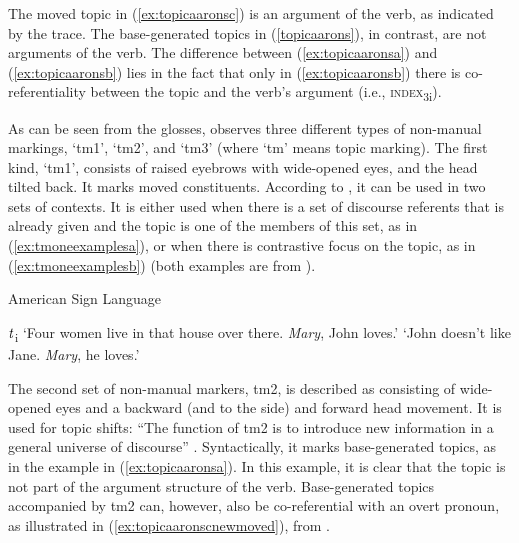 \noindent The moved topic in (\ref{ex:topicaaronsc}) is an argument of the verb, as indicated by the trace. The base-generated topics in (\ref{topicaarons}), in contrast, are not arguments of the verb. The difference between (\ref{ex:topicaaronsa}) and (\ref{ex:topicaaronsb}) lies in the fact that only in (\ref{ex:topicaaronsb}) there is co-referentiality between the topic and the verb's argument (i.e., \textsc{index}\textsubscript{3i}). 

As can be seen from the glosses, \citet{aarons1996topics} observes three different types of non-manual markings, `tm1', `tm2', and `tm3' (where `tm' means topic marking). The first kind, `tm1', consists of raised eyebrows with wide-opened eyes, and the head tilted back. It marks moved constituents. According to \citet{aarons1996topics}, it can be used in two sets of contexts. It is either used when there is a set of discourse referents that is already given and the topic is one of the members of this set, as in (\ref{ex:tmoneexamplesa}), or  when there is contrastive focus on the topic, as in (\ref{ex:tmoneexamplesb}) (both examples are from \citealt[76]{aarons1996topics}).

\begin{exe}
\ex American Sign Language \label{tmoneexamples}\begin{xlist} 
\ex {}   $\textrm{\textit{t}}$\textsubscript{i}
\glt `Four women live in that house over there. \textit{Mary}, John loves.' \label{ex:tmoneexamplesa}
\ex {}  
\glt `John doesn't like Jane. \textit{Mary}, he loves.' \label{ex:tmoneexamplesb}
\end{xlist}
\end{exe} 

\noindent The second set of non-manual markers, tm2, is described as consisting of wide-opened eyes and a backward (and to the side) and forward head movement. It is used for topic shifts: ``The function of tm2 is to introduce new information in a general universe of discourse'' \citep[79]{aarons1996topics}. Syntactically, it marks base-generated topics, as in the example in (\ref{ex:topicaaronsa}). In this example, it is clear that the topic is not part of the argument structure of the verb. Base-generated topics accompanied by tm2 can, however, also be co-referential with an overt pronoun, as illustrated in (\ref{ex:topicaaronscnewmoved}), from \citet[79]{aarons1996topics}.

